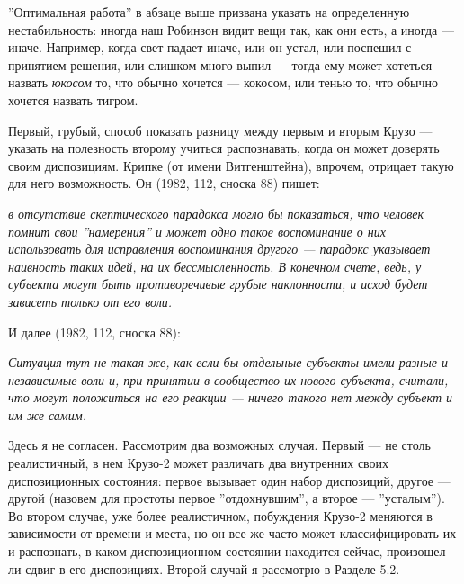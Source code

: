 \documentclass[11pt]{book}
\begin{document}
''Оптимальная работа'' в абзаце выше призвана указать на определенную нестабильность: иногда наш Робинзон видит вещи так, как они есть, а иногда --- иначе. Например, когда свет падает иначе, или он устал, или поспешил с принятием решения, или слишком много выпил --- тогда ему может хотеться назвать \textit{юкосом} то, что обычно хочется --- кокосом, или тенью то, что обычно хочется назвать тигром.

Первый, грубый, способ показать разницу между первым и вторым Крузо --- указать на полезность второму учиться распознавать, когда он может доверять своим диспозициям. Крипке (от имени Витгенштейна), впрочем, отрицает такую для него возможность. Он (1982, 112, сноска 88) пишет:

\smallskip

\textit{в отсутствие скептического парадокса могло бы показаться, что человек помнит свои ''намерения'' и может одно такое воспоминание о них использовать для исправления воспоминания другого --- парадокс указывает наивность таких идей, на их бессмысленность. В конечном счете, ведь, у субъекта могут быть противоречивые грубые наклонности, и исход будет зависеть только от его воли.}

\smallskip

И далее (1982, 112, сноска 88):

\smallskip

\textit{Ситуация тут не такая же, как если бы отдельные субъекты имели разные и независимые воли и, при принятии в сообщество их нового субъекта, считали, что могут положиться на его реакции --- ничего такого нет между субъект и им же самим.}

\smallskip

Здесь я не согласен. Рассмотрим два возможных случая. Первый --- не столь реалистичный, в нем Крузо-2 может различать два внутренних своих диспозиционных состояния: первое вызывает один набор диспозиций, другое --- другой (назовем для простоты первое ''отдохнувшим'', а второе --- ''усталым''). Во втором случае, уже более реалистичном, побуждения Крузо-2 меняются в зависимости от времени и места, но он все же часто может классифицировать их и распознать, в каком диспозиционном состоянии находится сейчас, произошел ли сдвиг в его диспозициях. Второй случай я рассмотрю в Разделе 5.2.
\end{document}
